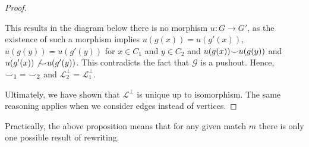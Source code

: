 \begin{proof}
\begin{itemize}
              This results in the diagram below there is no morphism $u : G \to G'$, as the existence of such a morphism implies $u(g(x)) = u(g'(x))$, $u(g(y)) = u(g'(y))$ for $x \in C_1$ and $y \in C_2$ and $u(g(x)) {\smile} u(g(y))$ and $u(g'(x)) \not {\smile} u(g'(y))$.
              This contradicts the fact that $\mathcal{G}$ is a pushout.
              Hence, ${\smile}_{1} = {\smile}_{2}$ and $\mathcal{L}_{2}^{\bot} = \mathcal{L}_{1}^{\bot}$.
    \end{itemize}
    Ultimately, we have shown that $\mathcal{L}^{\bot}$ is unique up to isomorphism.
    The same reasoning applies when we consider edges instead of vertices.
\end{proof}

Practically, the above proposition means that for any given match $m$ there is only one possible result of rewriting.




